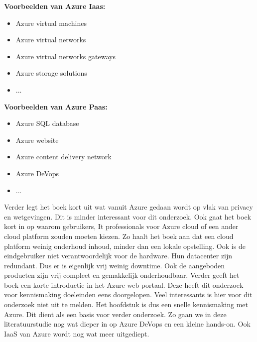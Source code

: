 \textbf{Voorbeelden van Azure Iaas:}
\begin{itemize}
    \item Azure virtual machines
    \item Azure virtual networks
    \item Azure virtual networks gateways
    \item Azure storage solutions
    \item ...
\end{itemize}
\textbf{Voorbeelden van Azure Paas:}
\begin{itemize}
    \item Azure SQL database
    \item Azure website
    \item Azure content delivery network
    \item Azure DeVops
    \item ...
\end{itemize}
Verder legt het boek  \autocite{Copeland2015} kort uit wat vanuit Azure gedaan wordt op vlak van privacy en wetgevingen. Dit is minder interessant voor dit onderzoek. Ook gaat het boek kort in op waarom gebruikers, It professionals voor Azure cloud of een ander cloud platform zouden moeten kiezen. Zo haalt het boek  \autocite{Copeland2015} aan dat een cloud platform weinig onderhoud inhoud, minder dan een lokale opstelling. Ook is de eindgebruiker niet verantwoordelijk voor de hardware. Hun datacenter zijn redundant. Dus er is eigenlijk vrij weinig downtime. Ook de aangeboden producten zijn vrij compleet en gemakkelijk onderhoudbaar.
\newline
\newline
Verder geeft het boek  \autocite{Copeland2015} een korte introductie in het Azure web portaal. Deze heeft dit onderzoek voor kennismaking doeleinden eens doorgelopen. Veel interessants is hier voor dit onderzoek niet uit te melden. Het hoofdstuk is dus een snelle kennismaking met Azure. Dit dient als een basis voor verder onderzoek. Zo gaan we in deze literatuurstudie nog wat dieper in op Azure DeVops en een kleine hands-on. Ook IaaS van Azure wordt nog wat meer uitgediept.
\newline
\newline
